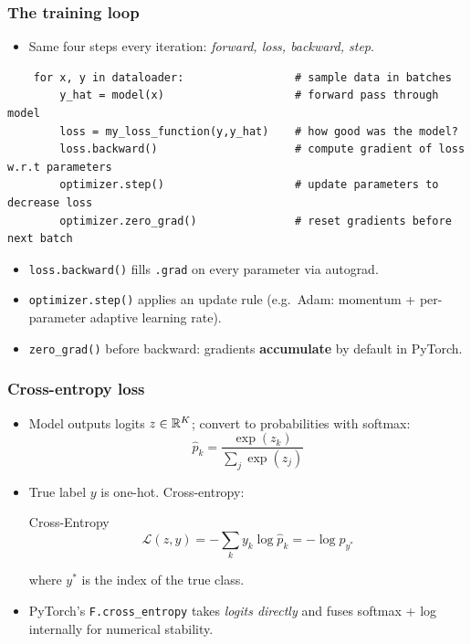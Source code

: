 \begin{frame}[fragile]
\frametitle{The training loop}
\begin{itemize}
    \item Same four steps every iteration: \textit{forward, loss, backward, step}.
\end{itemize}
\begin{block}{}
\begin{lstlisting}
    for x, y in dataloader:                 # sample data in batches
        y_hat = model(x)                    # forward pass through model
        loss = my_loss_function(y,y_hat)    # how good was the model?
        loss.backward()                     # compute gradient of loss w.r.t parameters
        optimizer.step()                    # update parameters to decrease loss
        optimizer.zero_grad()               # reset gradients before next batch
\end{lstlisting}
\end{block}
\pause
\begin{itemize}
    \item \texttt{loss.backward()} fills \texttt{.grad} on every parameter via
    autograd.
    \pause
    \item \texttt{optimizer.step()} applies an update rule
    (e.g.\ Adam: momentum + per-parameter adaptive learning rate).
    \pause
    \item \texttt{zero\_grad()} before backward: gradients \textbf{accumulate}
    by default in PyTorch.
\end{itemize}
\end{frame}

\begin{frame}
\frametitle{Cross-entropy loss}
\begin{itemize}
    \item Model outputs logits $z \in \mathbb{R}^K$; convert to probabilities with
    softmax:
    $$ \hat{p}_k = \frac{\exp(z_k)}{\sum_j \exp(z_j)} $$
    \pause
    \item True label $y$ is one-hot. Cross-entropy:
    \begin{block}{Cross-Entropy}
        $$ \mathcal{L}(z, y) = -\sum_{k} y_k \log \hat{p}_k
        = -\log \hat{p}_{y^*} $$
    \end{block}
    where $y^*$ is the index of the true class.
    \pause
    \item PyTorch's \texttt{F.cross\_entropy} takes \textit{logits directly}
    and fuses softmax + log internally for numerical stability.
\end{itemize}
\end{frame}

